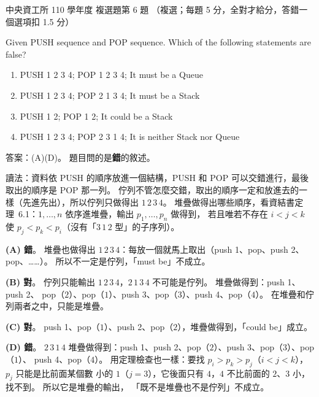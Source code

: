 \begin{pastexam}[label={px:ncu-110-dsa-06}]{中央資工所 110 學年度 複選題第 6 題}
（複選；每題 5 分，全對才給分，答錯一個選項扣 1.5 分）

Given PUSH sequence and POP sequence. Which of the following statements are false?
\begin{enumerate}[label=(\Alph*)]
\item PUSH 1 2 3 4; POP 1 2 3 4; It must be a Queue
\item PUSH 1 2 3 4; POP 2 1 3 4; It must be a Stack
\item PUSH 1 2; POP 1 2; It could be a Stack
\item PUSH 1 2 3 4; POP 2 3 1 4; It is neither Stack nor Queue
\end{enumerate}
\end{pastexam}

\begin{pastsoln}
答案：(A)(D)。 題目問的是\textbf{錯}的敘述。

讀法：資料依 PUSH 的順序放進一個結構，PUSH 和 POP 可以交錯進行，最後取出的順序是 POP 那一列。
佇列不管怎麼交錯，取出的順序一定和放進去的一樣（先進先出），所以佇列只做得出 $1\,2\,3\,4$。
堆疊做得出哪些順序，看資結書定理~6.1：$1, \ldots, n$ 依序進堆疊，輸出 $p_1, \ldots, p_n$ 做得到，
若且唯若不存在 $i < j < k$ 使 $p_j < p_k < p_i$（沒有「$3\,1\,2$ 型」的子序列）。

\textbf{(A) 錯}。 堆疊也做得出 $1\,2\,3\,4$：每放一個就馬上取出（push 1、pop、push 2、pop、……）。
所以不一定是佇列，「must be」不成立。

\textbf{(B) 對}。 佇列只能輸出 $1\,2\,3\,4$，$2\,1\,3\,4$ 不可能是佇列。 堆疊做得到：push 1、push 2、
pop（$2$）、pop（$1$）、push 3、pop（$3$）、push 4、pop（$4$）。 在堆疊和佇列兩者之中，只能是堆疊。

\textbf{(C) 對}。 push 1、pop（$1$）、push 2、pop（$2$），堆疊做得到，「could be」成立。

\textbf{(D) 錯}。 $2\,3\,1\,4$ 堆疊做得到：push 1、push 2、pop（$2$）、push 3、pop（$3$）、pop（$1$）、
push 4、pop（$4$）。 用定理檢查也一樣：要找 $p_i > p_k > p_j$（$i < j < k$），$p_j$ 只能是比前面某個數
小的 $1$（$j = 3$），它後面只有 $4$，$4$ 不比前面的 $2$、$3$ 小，找不到。 所以它是堆疊的輸出，
「既不是堆疊也不是佇列」不成立。
\end{pastsoln}
